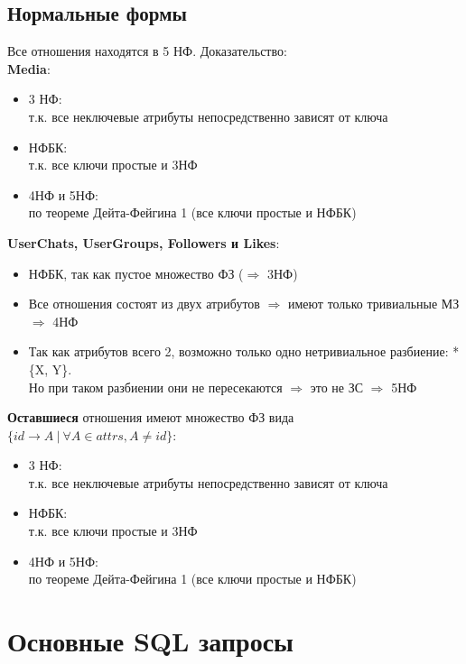 \documentclass[12pt, a4paper] {ncc}
\begin{document}
\subsection{Нормальные формы}
Все отношения находятся в 5 НФ. Доказательство:\\
\textbf{Media}:
\begin{itemize}
\item 3 НФ: \\
т.к. все неключевые атрибуты непосредственно зависят от ключа
\item НФБК: \\
т.к. все ключи простые и 3НФ
\item 4НФ и 5НФ: \\
по теореме Дейта-Фейгина 1 (все ключи простые и НФБК)
\end{itemize}
\textbf{UserChats, UserGroups, Followers и Likes}:
\begin{itemize}
\item НФБК, так как пустое множество ФЗ ($\Rightarrow$ 3НФ)
\item Все отношения состоят из двух атрибутов $\Rightarrow$ имеют только тривиальные МЗ $\Rightarrow$ 4НФ
\item Так как атрибутов всего 2, возможно только одно нетривиальное разбиение: *\{X, Y\}.\\ 
Но при таком разбиении они не пересекаются $\Rightarrow$ это не ЗС $\Rightarrow$ 5НФ
\end{itemize}
\textbf{Оставшиеся} отношения имеют множество ФЗ вида \\
$\{id \rightarrow A ~ | ~ \forall A \in \textit{attrs}, A \ne id\}$:
\begin{itemize}
\item 3 НФ: \\
т.к. все неключевые атрибуты непосредственно зависят от ключа
\item НФБК: \\
т.к. все ключи простые и 3НФ
\item 4НФ и 5НФ: \\
по теореме Дейта-Фейгина 1 (все ключи простые и НФБК)
\end{itemize}
\section{Основные SQL запросы}
\end{document}
